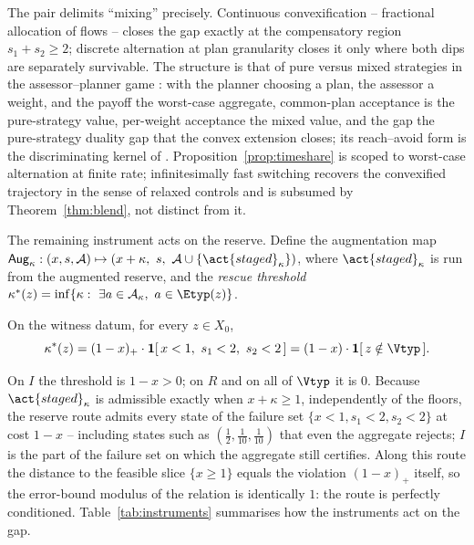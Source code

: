 The pair delimits ``mixing'' precisely. Continuous convexification -- fractional allocation of flows -- closes the gap exactly at the compensatory region $s_1+s_2\ge2$; discrete alternation at plan granularity closes it only where both dips are separately survivable. The structure is that of pure versus mixed strategies in the assessor--planner game \citep{vonNeumann1928,Sion1958}: with the planner choosing a plan, the assessor a weight, and the payoff the worst-case aggregate, common-plan acceptance is the pure-strategy value, per-weight acceptance the mixed value, and the gap the pure-strategy duality gap that the convex extension closes; its reach--avoid form is the discriminating kernel of \citet{Cardaliaguet1996}. Proposition~\ref{prop:timeshare} is scoped to worst-case alternation at finite rate; infinitesimally fast switching recovers the convexified trajectory in the sense of relaxed controls \citep{Filippov1988,Warga1972} and is subsumed by Theorem~\ref{thm:blend}, not distinct from it.

The remaining instrument acts on the reserve. Define the augmentation map $\mathsf{Aug}_\kappa:(x,s,\mathcal A)\mapsto(x+\kappa,\ s,\ \mathcal A\cup\{\act{staged}_\kappa\})$, where $\act{staged}_\kappa$ is  run from the augmented reserve, and the \emph{rescue threshold} $\kappa^*(z)=\inf\{\kappa:\ \exists a\in\mathcal A_\kappa,\ a\in\Etyp(z)\}$.

\begin{proposition}\label{prop:rescue}
On the witness datum, for every $z\in X_0$,
\[
\kappa^*(z)=(1-x)_+\cdot\mathbf 1[\,x<1,\ s_1<2,\ s_2<2\,]=(1-x)\cdot\mathbf 1[\,z\notin\Vtyp\,].
\]
\end{proposition}

On $I$ the threshold is $1-x>0$; on $R$ and on all of $\Vtyp$ it is $0$. Because $\act{staged}_\kappa$ is admissible exactly when $x+\kappa\ge1$, independently of the floors, the reserve route admits every state of the failure set $\{x<1,s_1<2,s_2<2\}$ at cost $1-x$ -- including states such as $(\tfrac12,\tfrac1{10},\tfrac1{10})$ that even the aggregate rejects; $I$ is the part of the failure set on which the aggregate still certifies. Along this route the distance to the feasible slice $\{x\ge1\}$ equals the violation $(1-x)_+$ itself, so the error-bound modulus \citep{Fabian2010} of the relation is identically $1$: the route is perfectly conditioned. Table~\ref{tab:instruments} summarises how the instruments act on the gap.

